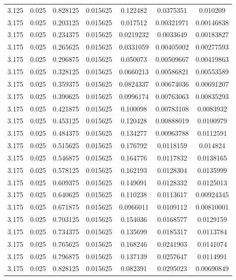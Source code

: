 \begin{table}[bh]
\begin{center}
{\begin{tabular}{ccccccc}
3.125	 & 0.025 & 	0.828125	 & 0.015625	 & 0.122482	 & 0.0375351	 & 0.010209 \\ 
3.175	 & 0.025 & 	0.203125	 & 0.015625	 & 0.017512	 & 0.00321971	 & 0.00146838 \\ 
3.175	 & 0.025 & 	0.234375	 & 0.015625	 & 0.0219232	 & 0.0033649	 & 0.00183827 \\ 
3.175	 & 0.025 & 	0.265625	 & 0.015625	 & 0.0331059	 & 0.00405002	 & 0.00277593 \\ 
3.175	 & 0.025 & 	0.296875	 & 0.015625	 & 0.050073	 & 0.00509667	 & 0.00419863 \\ 
3.175	 & 0.025 & 	0.328125	 & 0.015625	 & 0.0660213	 & 0.00586821	 & 0.00553589 \\ 
3.175	 & 0.025 & 	0.359375	 & 0.015625	 & 0.0824337	 & 0.00674036	 & 0.00691207 \\ 
3.175	 & 0.025 & 	0.390625	 & 0.015625	 & 0.0996174	 & 0.00763063	 & 0.00835293 \\ 
3.175	 & 0.025 & 	0.421875	 & 0.015625	 & 0.100098	 & 0.00783108	 & 0.0083932 \\ 
3.175	 & 0.025 & 	0.453125	 & 0.015625	 & 0.120428	 & 0.00888019	 & 0.0100979 \\ 
3.175	 & 0.025 & 	0.484375	 & 0.015625	 & 0.134277	 & 0.00963788	 & 0.0112591 \\ 
3.175	 & 0.025 & 	0.515625	 & 0.015625	 & 0.176792	 & 0.0118159	 & 0.014824 \\ 
3.175	 & 0.025 & 	0.546875	 & 0.015625	 & 0.164776	 & 0.0117832	 & 0.0138165 \\ 
3.175	 & 0.025 & 	0.578125	 & 0.015625	 & 0.162193	 & 0.0128304	 & 0.0135999 \\ 
3.175	 & 0.025 & 	0.609375	 & 0.015625	 & 0.149091	 & 0.0128332	 & 0.0125013 \\ 
3.175	 & 0.025 & 	0.640625	 & 0.015625	 & 0.110238	 & 0.0113617	 & 0.00924345 \\ 
3.175	 & 0.025 & 	0.671875	 & 0.015625	 & 0.0966011	 & 0.0109112	 & 0.00810001 \\ 
3.175	 & 0.025 & 	0.703125	 & 0.015625	 & 0.154036	 & 0.0168577	 & 0.0129159 \\ 
3.175	 & 0.025 & 	0.734375	 & 0.015625	 & 0.135699	 & 0.0185317	 & 0.0113784 \\ 
3.175	 & 0.025 & 	0.765625	 & 0.015625	 & 0.168246	 & 0.0241903	 & 0.0141074 \\ 
3.175	 & 0.025 & 	0.796875	 & 0.015625	 & 0.137139	 & 0.0257647	 & 0.0114991 \\ 
3.175	 & 0.025 & 	0.828125	 & 0.015625	 & 0.082391	 & 0.0295023	 & 0.00690849 \\ 

\end{tabular}}
\end{center}
\end{table}
